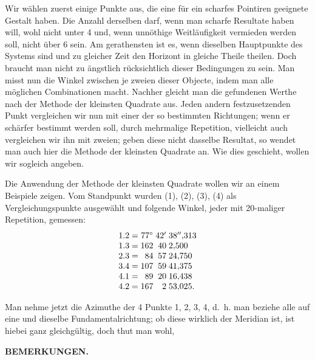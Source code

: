 \begin{center}
\end{center}

Wir wählen zuerst einige Punkte aus, die eine für ein scharfes Pointiren geeignete Gestalt haben. Die Anzahl derselben darf, wenn man scharfe Resultate haben will, wohl nicht unter 4 und, wenn unnöthige Weitläufigkeit vermieden werden soll, nicht über 6 sein. Am gerathensten ist es, wenn dieselben Hauptpunkte des Systems sind und zu gleicher Zeit den Horizont in gleiche Theile theilen. Doch braucht man nicht zu ängstlich rücksichtlich dieser Bedingungen zu sein. Man misst nun die Winkel zwischen je zweien dieser Objecte, indem man alle möglichen Combinationen macht. Nachher gleicht man die gefundenen Werthe nach der Methode der kleinsten Quadrate aus. Jeden andern festzusetzenden Punkt vergleichen wir nun mit einer der so bestimmten Richtungen; wenn er schärfer bestimmt werden soll, durch mehrmalige Repetition, vielleicht auch vergleichen wir ihn mit zweien; geben diese nicht dasselbe Resultat, so wendet man auch hier die Methode der kleinsten Quadrate an. Wie dies geschieht, wollen wir sogleich angeben.

Die Anwendung der Methode der kleinsten Quadrate wollen wir an einem Beispiele zeigen. Vom Standpunkt  wurden  (1),  (2),  (3),  (4) als Vergleichungspunkte ausgewählt und folgende Winkel, jeder mit 20-maliger Repetition, gemessen:
\[
\begin{array}{@{}r@{\;=\;}r@{\;}r@{\;}l@{}}
 1.2&77^\circ&42'&38''{,}313\\
 1.3&162&40&2{,}500\\
 2.3&84&57&24{,}750\\
 3.4&107&59&41{,}375\\
 4.1&89&20&16{,}438\\
 4.2&167&2&53{,}025.
\end{array}
\]

Man nehme jetzt die Azimuthe der 4 Punkte 1, 2, 3, 4, d.~h. man beziehe alle auf eine und dieselbe Fundamentalrichtung; ob diese wirklich der Meridian ist, ist hiebei ganz gleichgültig, doch thut man wohl,
\par\smallskip\noindent{}\par

\par\clearpage
\noindent{}\hfill{\small\textbf{BEMERKUNGEN.}}\hfill\null\par\medskip

